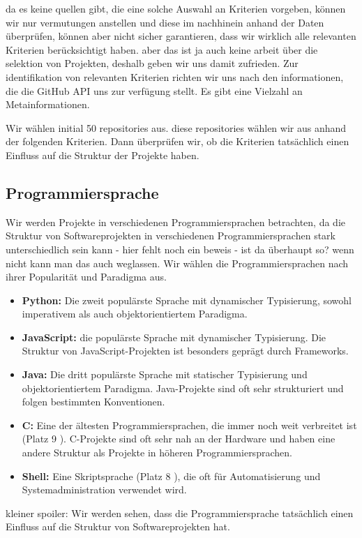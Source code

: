 da es keine quellen gibt, die eine solche Auswahl an Kriterien vorgeben, können wir nur vermutungen anstellen und diese im nachhinein anhand der Daten überprüfen, können aber nicht sicher garantieren, dass wir wirklich alle relevanten Kriterien berücksichtigt haben. aber das ist ja auch keine arbeit über die selektion von Projekten, deshalb geben wir uns damit zufrieden.
Zur identifikation von relevanten Kriterien richten wir uns nach den informationen, die die GitHub API uns zur verfügung stellt. Es gibt eine Vielzahl an Metainformationen. 

Wir wählen initial 50 repositories aus. diese repositories wählen wir aus anhand der folgenden Kriterien. Dann überprüfen wir, ob die Kriterien tatsächlich einen Einfluss auf die Struktur der Projekte haben.

\subsection*{Programmiersprache} Wir werden Projekte in verschiedenen Programmiersprachen betrachten, da die Struktur von Softwareprojekten in verschiedenen Programmiersprachen stark unterschiedlich sein kann - hier fehlt noch ein beweis - ist da überhaupt so? wenn nicht kann man das auch weglassen. Wir wählen die Programmiersprachen nach ihrer Popularität und Paradigma aus. 
    \begin{itemize}
        \item \textbf{Python:} Die zweit populärste Sprache \cite{software_state_2022} mit dynamischer Typisierung, sowohl imperativem als auch objektorientiertem Paradigma. 
        \item \textbf{JavaScript:} die populärste Sprache \cite{software_state_2022} mit dynamischer Typisierung. Die Struktur von JavaScript-Projekten ist besonders geprägt durch Frameworks.
        \item \textbf{Java:} Die dritt populärste Sprache \cite{software_state_2022} mit statischer Typisierung und objektorientiertem Paradigma. Java-Projekte sind oft sehr strukturiert und folgen bestimmten Konventionen.
        \item \textbf{C:} Eine der ältesten Programmiersprachen, die immer noch weit verbreitet ist (Platz 9 \cite{software_state_2022}). C-Projekte sind oft sehr nah an der Hardware und haben eine andere Struktur als Projekte in höheren Programmiersprachen.
        \item \textbf{Shell:} Eine Skriptsprache (Platz 8 \cite{software_state_2022}), die oft für Automatisierung und Systemadministration verwendet wird.
    \end{itemize}
   kleiner spoiler: Wir werden sehen, dass die Programmiersprache tatsächlich einen Einfluss auf die Struktur von Softwareprojekten hat.


